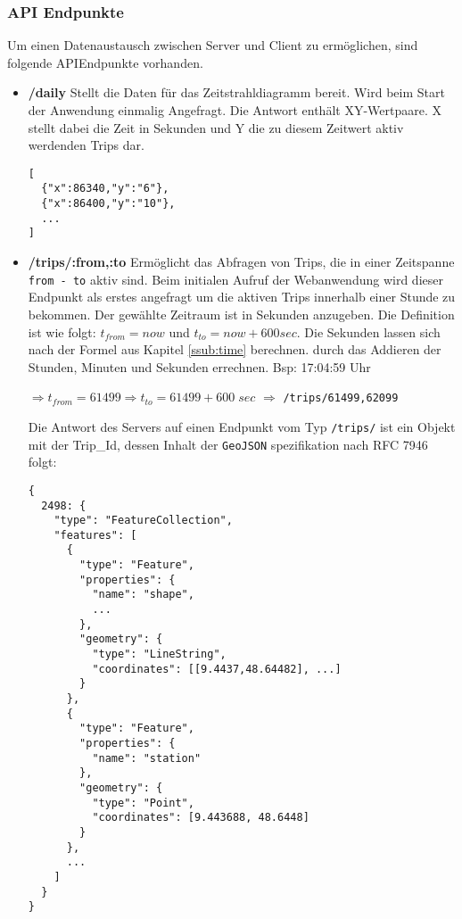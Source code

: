 \subsubsection{API Endpunkte}
\label{ssub:api_endpunkte}
  Um einen Datenaustausch zwischen Server und Client zu ermöglichen, sind folgende API\footnotemark Endpunkte vorhanden. 


  \begin{itemize}[label={}]
    \item \textbf{/daily} Stellt die Daten für das Zeitstrahldiagramm bereit. Wird beim Start der Anwendung einmalig Angefragt. Die Antwort enthält XY-Wertpaare. X stellt dabei die Zeit in Sekunden und Y die zu diesem Zeitwert aktiv werdenden Trips dar.

\begin{lstlisting}[captionpos=t, caption=Antwort des Servers zur Anfrage \texttt{/daily}, label=lst:daily_response]
[
  {"x":86340,"y":"6"},
  {"x":86400,"y":"10"}, 
  ...
]
\end{lstlisting}

    \item \textbf{/trips/:from,:to} Ermöglicht das Abfragen von Trips, die in einer Zeitspanne \texttt{from - to} aktiv sind. Beim initialen Aufruf der Webanwendung wird dieser Endpunkt als erstes angefragt um die aktiven Trips innerhalb einer Stunde zu bekommen. Der gewählte Zeitraum ist in Sekunden anzugeben. Die Definition ist wie folgt: $t_{from} = now$ und $t_{to} = now + 600 sec$. Die Sekunden lassen sich nach der Formel aus Kapitel \ref{ssub:time} berechnen.
     durch das Addieren der Stunden, Minuten und Sekunden errechnen. Bsp: 17:04:59 Uhr

    $\Rightarrow t_{from} = 61499 \Rightarrow t_{to} = 61499 + 600\;sec$ $\Rightarrow$ \texttt{/trips/61499,62099}

    Die Antwort des Servers auf einen Endpunkt vom Typ \texttt{/trips/} ist ein Objekt mit der Trip\_Id, dessen Inhalt der \texttt{GeoJSON} spezifikation nach RFC 7946 folgt:

\begin{lstlisting}[captionpos=t, caption=Trip Objekt, label=lst:trip_object]
{
  2498: {  
    "type": "FeatureCollection",
    "features": [
      {
        "type": "Feature",
        "properties": {
          "name": "shape",
          ...
        },
        "geometry": {
          "type": "LineString",
          "coordinates": [[9.4437,48.64482], ...]
        }
      },
      {
        "type": "Feature",
        "properties": {
          "name": "station"
        },
        "geometry": {
          "type": "Point",
          "coordinates": [9.443688, 48.6448]
        }
      },
      ...
    ]
  }
}
\end{lstlisting}
  

\end{itemize}
